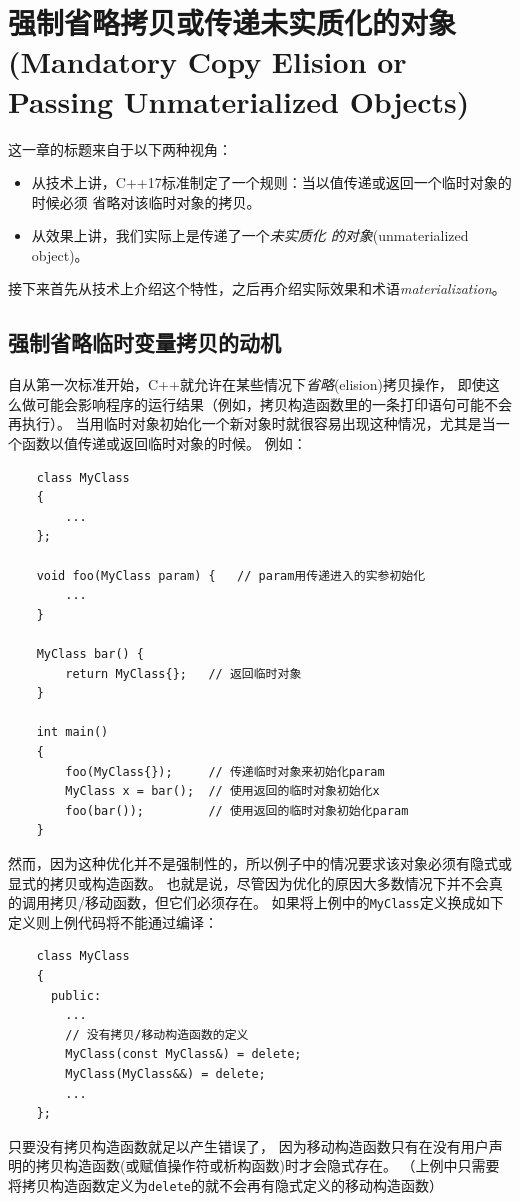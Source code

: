 \section[强制省略拷贝或传递未实质化的对象] {强制省略拷贝或传递未实质化的对象
(Mandatory Copy Elision or Passing Unmaterialized Objects)}\label{ch5}
这一章的标题来自于以下两种视角：
\begin{itemize}[leftmargin=*]
    \item 从技术上讲，C++17标准制定了一个规则：当以值传递或返回一个临时对象的时候必须
    省略对该临时对象的拷贝。
    \item 从效果上讲，我们实际上是传递了一个\emph{未实质化 的对象}(unmaterialized object)。
\end{itemize}
接下来首先从技术上介绍这个特性，之后再介绍实际效果和术语\emph{materialization}。

\subsection{强制省略临时变量拷贝的动机}
自从第一次标准开始，C++就允许在某些情况下\emph{省略}(elision)拷贝操作，
即使这么做可能会影响程序的运行结果（例如，拷贝构造函数里的一条打印语句可能不会再执行）。
当用临时对象初始化一个新对象时就很容易出现这种情况，尤其是当一个函数以值传递或返回临时对象的时候。
例如：
\begin{lstlisting}
    class MyClass
    {
        ...
    };

    void foo(MyClass param) {   // param用传递进入的实参初始化
        ...
    }

    MyClass bar() {
        return MyClass{};   // 返回临时对象
    }

    int main()
    {
        foo(MyClass{});     // 传递临时对象来初始化param
        MyClass x = bar();  // 使用返回的临时对象初始化x
        foo(bar());         // 使用返回的临时对象初始化param
    }
\end{lstlisting}
然而，因为这种优化并不是强制性的，所以例子中的情况要求该对象必须有隐式或显式的拷贝或构造函数。
也就是说，尽管因为优化的原因大多数情况下并不会真的调用拷贝/移动函数，但它们必须存在。
如果将上例中的\texttt{MyClass}定义换成如下定义则上例代码将不能通过编译：
\begin{lstlisting}
    class MyClass
    {
      public:
        ...
        // 没有拷贝/移动构造函数的定义
        MyClass(const MyClass&) = delete;
        MyClass(MyClass&&) = delete;
        ...
    };
\end{lstlisting}
只要没有拷贝构造函数就足以产生错误了，
因为移动构造函数只有在没有用户声明的拷贝构造函数(或赋值操作符或析构函数)时才会隐式存在。
（上例中只需要将拷贝构造函数定义为\texttt{delete}的就不会再有隐式定义的移动构造函数）

